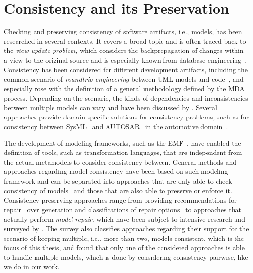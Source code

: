 \section{Consistency and its Preservation}

Checking and preserving consistency of software artifacts, i.e., models, has been researched in several contexts.
It covers a broad topic and is often traced back to the \emph{view-update problem}, which considers the backpropagation of changes within a view to the original source and is especially known from database engineering~\cite{bancilhon1981viewUpdate-TDS}.
Consistency has been considered for different development artifacts, including the common scenario of \emph{roundtrip engineering} between \gls{UML} models and code~\cite{dantas2005umlsync-ISPSE}, and especially rose with the definition of a general methodology defined by the \gls{MDA}~\cite{mda} process.
Depending on the scenario, the kinds of dependencies and inconsistencies between multiple models can vary and have been discussed by \textcite{kolovos2008a}. 
Several approaches provide domain-specific solutions for consistency problems, such as for consistency between SysML~\cite{sysml} and AUTOSAR~\cite{scheid2015autosar} in the automotive domain~\cite{giese2010a}.

The development of modeling frameworks, such as the \gls{EMF}~\cite{steinberg2009emf}, have enabled the definition of tools, such as transformation languages, that are independent from the actual metamodels to consider consistency between.
General methods and approaches regarding model consistency have been based on such modeling framework and can be separated into approaches that are only able to check consistency of models~\cite{reder2012incrementalchecking} and those that are also able to preserve or enforce it.
Consistency-preserving approaches range from providing recommendations for repair~\cite{ohrndorf2018repairRecommendataions-ICSE} over generation and classifications of repair options~\cite{kretschmer2018repairDiscovery-ICSE} to approaches that actually perform \emph{model repair}, which have been subject to intensive research and surveyed by \textcite{macedo2017ModelRepairClassification-TSE}.
The survey also classifies approaches regarding their support for the scenario of keeping multiple, i.e., more than two, models consistent, which is the focus of this thesis, and found that only one of the considered approaches is able to handle multiple models, which is done by considering consistency pairwise, like we do in our work.

